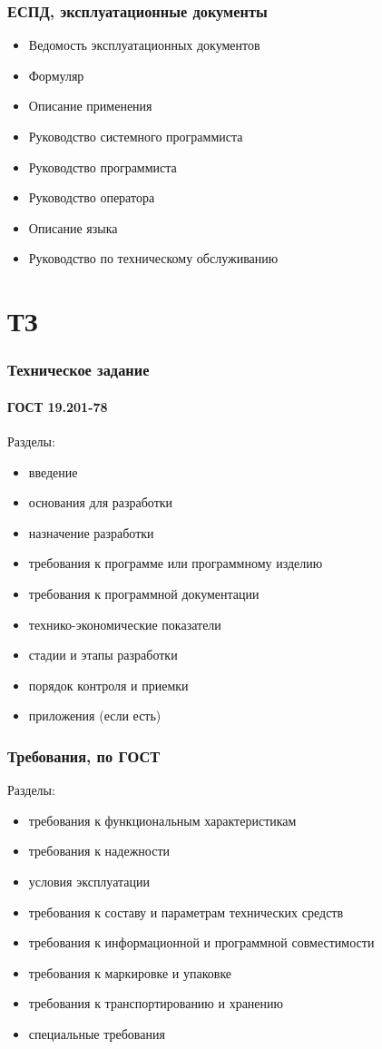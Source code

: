 \documentclass[xetex,mathserif,serif]{beamer}
\begin{document}
	\begin{frame}
		\frametitle{ЕСПД, эксплуатационные документы}
		\begin{itemize}
			\item Ведомость эксплуатационных документов
			\item Формуляр
			\item Описание применения
			\item Руководство системного программиста
			\item Руководство программиста
			\item Руководство оператора
			\item Описание языка
			\item Руководство по техническому обслуживанию
		\end{itemize}
	\end{frame}

	\section{ТЗ}

	\begin{frame}
		\frametitle{Техническое задание}
		\framesubtitle{ГОСТ 19.201-78}
		Разделы:
		\begin{itemize}
			\item введение
			\item основания для разработки
			\item назначение разработки
			\item требования к программе или программному изделию
			\item требования к программной документации
			\item технико-экономические показатели
			\item стадии и этапы разработки
			\item порядок контроля и приемки
			\item приложения (если есть)
		\end{itemize}
	\end{frame}

	\begin{frame}
		\frametitle{Требования, по ГОСТ}
		Разделы:
		\begin{itemize}
			\item требования к функциональным характеристикам
			\item требования к надежности
			\item условия эксплуатации
			\item требования к составу и параметрам технических средств
			\item требования к информационной и программной совместимости
			\item требования к маркировке и упаковке
			\item требования к транспортированию и хранению
			\item специальные требования
		\end{itemize}
	\end{frame}
\end{document}
